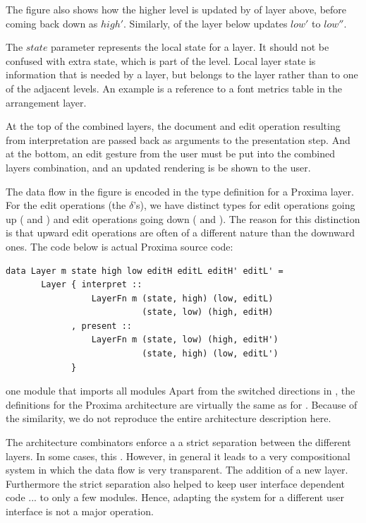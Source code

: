 \documentclass[preprint,natbib]{sigplanconf}
\begin{document}
The figure also shows how the higher level is updated by  of layer above, before coming back down as $high'$. Similarly,  of the layer below updates $low'$ to $low''$. 

The $state$ parameter represents the local state for a layer. It should not be confused with extra state, which is part of the level. Local layer state is information that is needed by a layer, but belongs to the layer rather than to one of the adjacent levels. An example is a reference to a font metrics table in the arrangement layer.

At the top of the combined layers, the document and edit operation resulting from interpretation are passed back as arguments to the presentation step. And at the bottom, an edit gesture from the user must be put into the combined layers combination, and an updated rendering is be shown to the user. 
\ec

The data flow in the figure is encoded in the type definition for a Proxima layer. For the edit operations (the $\delta$'s), we have distinct types for edit operations going up  ( and ) and edit operations going down ( and ). The reason for this distinction is that upward edit operations are often of a different nature than the downward ones. The code below is actual Proxima source code:

\begin{small}
\begin{verbatim}
data Layer m state high low editH editL editH' editL' =
       Layer { interpret ::
                 LayerFn m (state, high) (low, editL)
                           (state, low) (high, editH)
             , present ::
                 LayerFn m (state, low) (high, editH')
                           (state, high) (low, editL')
             }
\end{verbatim}
\end{small}

one module that imports all modules
Apart from the switched directions in , the definitions for the Proxima architecture are virtually the same as for . Because of the similarity, we do not reproduce the entire architecture description here.



\bc
\bigskip

The architecture combinators enforce a a strict separation between the different layers. In some cases, this . However, in general it leads to a very compositional system in which the data flow is very transparent. The addition of a new layer. Furthermore the strict separation also helped to keep user interface dependent code ... to only a few modules. Hence, adapting the system for a different user interface is not a major operation.
\end{document}
